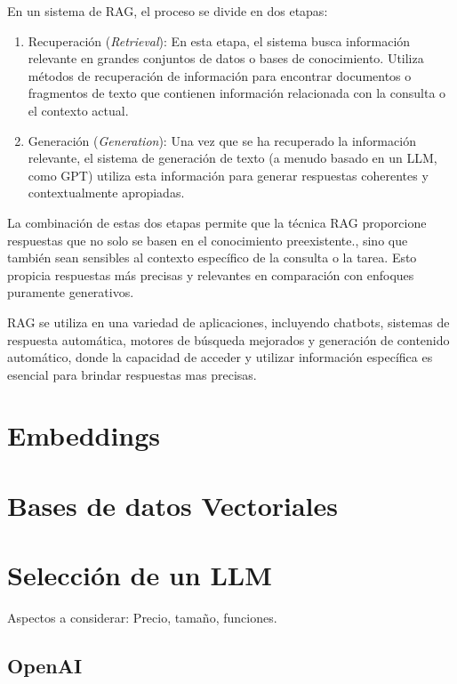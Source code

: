 En un sistema de RAG, el proceso se divide en dos etapas:

\begin{enumerate}
    \item Recuperación (\textit{Retrieval}): En esta etapa, el sistema busca información relevante en grandes conjuntos de datos o bases de conocimiento. Utiliza métodos de recuperación de información para encontrar documentos o fragmentos de texto que contienen información relacionada con la consulta o el contexto actual.

    \item Generación (\textit{Generation}): Una vez que se ha recuperado la información relevante, el sistema de generación de texto (a menudo basado en un LLM, como GPT) utiliza esta información para generar respuestas coherentes y contextualmente apropiadas.
    
\end{enumerate}

La combinación de estas dos etapas permite que la técnica RAG proporcione respuestas que no solo se basen en el conocimiento preexistente\cite{chen-etal-2017-reading}., sino que también sean sensibles al contexto específico de la consulta o la tarea. Esto propicia respuestas más precisas y relevantes en comparación con enfoques puramente generativos\cite{fan-etal-2019-eli5,hossain-etal-2020-simple}.

RAG se utiliza en una variedad de aplicaciones, incluyendo chatbots, sistemas de respuesta automática, motores de búsqueda mejorados y generación de contenido automático, donde la capacidad de acceder y utilizar información específica es esencial para brindar respuestas mas precisas.

\section{Embeddings}

\section{Bases de datos Vectoriales}

\section{Selección de un LLM}

Aspectos a considerar: Precio, tamaño, funciones.

\subsection{OpenAI}

